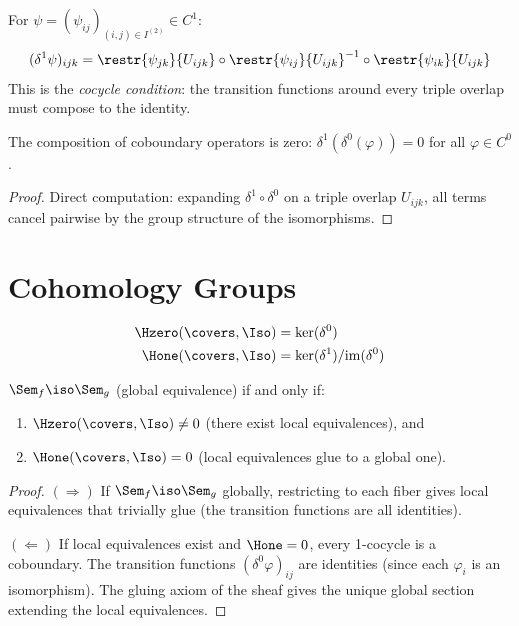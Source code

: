 \begin{definition}
For $\psi = (\psi_{ij})_{(i,j) \in I^{(2)}} \in C^1$:
\[
  (\delta^1 \psi)_{ijk} = \restr{\psi_{jk}}{U_{ijk}} \circ
    \restr{\psi_{ij}}{U_{ijk}}^{-1} \circ \restr{\psi_{ik}}{U_{ijk}}
\]
This is the \emph{cocycle condition}: the transition functions around
every triple overlap must compose to the identity.
\end{definition}

\begin{lemma}[$\delta^1 \circ \delta^0 = 0$]
The composition of coboundary operators is zero:
$\delta^1(\delta^0(\varphi)) = 0$ for all $\varphi \in C^0$.
\end{lemma}

\begin{proof}
Direct computation: expanding $\delta^1 \circ \delta^0$ on a triple
overlap $U_{ijk}$, all terms cancel pairwise by the group structure
of the isomorphisms.
\end{proof}

\section{Cohomology Groups}

\begin{definition}
\begin{align}
  \Hzero(\covers, \Iso) &= \ker(\delta^0) \\
  \Hone(\covers, \Iso) &= \ker(\delta^1) / \mathrm{im}(\delta^0)
\end{align}
\end{definition}

\begin{theorem}
\label{thm:descent-full}
$\Sem_f \iso \Sem_g$ (global equivalence) if and only if:
\begin{enumerate}
  \item $\Hzero(\covers, \Iso) \neq 0$ (there exist local equivalences), and
  \item $\Hone(\covers, \Iso) = 0$ (local equivalences glue to a
    global one).
\end{enumerate}
\end{theorem}

\begin{proof}
$(\Rightarrow)$ If $\Sem_f \iso \Sem_g$ globally, restricting to
each fiber gives local equivalences that trivially glue (the
transition functions are all identities).

$(\Leftarrow)$ If local equivalences exist and $\Hone = 0$, every
1-cocycle is a coboundary.  The transition functions
$(\delta^0 \varphi)_{ij}$ are identities (since each $\varphi_i$ is
an isomorphism).  The gluing axiom of the sheaf gives the unique
global section extending the local equivalences.
\end{proof}

